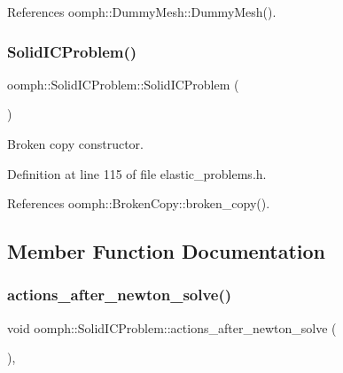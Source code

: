 References oomph\+::\+Dummy\+Mesh\+::\+Dummy\+Mesh().

\mbox{\label{classoomph_1_1SolidICProblem_a2f8924f554988e4c9bb98281231f9767}} 
\subsubsection{\texorpdfstring{Solid\+I\+C\+Problem()}{SolidICProblem()}\hspace{0.1cm}{\footnotesize\ttfamily [2/2]}}
{\footnotesize\ttfamily oomph\+::\+Solid\+I\+C\+Problem\+::\+Solid\+I\+C\+Problem (\begin{DoxyParamCaption}\item[{const \hyperlink{classoomph_1_1SolidICProblem}{Solid\+I\+C\+Problem} \&}]{ }\end{DoxyParamCaption})\hspace{0.3cm}{\ttfamily [inline]}}



Broken copy constructor. 



Definition at line 115 of file elastic\+\_\+problems.\+h.



References oomph\+::\+Broken\+Copy\+::broken\+\_\+copy().



\subsection{Member Function Documentation}
\mbox{\label{classoomph_1_1SolidICProblem_afef1ae777a009afd2329dcb091862f69}} 
\subsubsection{\texorpdfstring{actions\+\_\+after\+\_\+newton\+\_\+solve()}{actions\_after\_newton\_solve()}}
{\footnotesize\ttfamily void oomph\+::\+Solid\+I\+C\+Problem\+::actions\+\_\+after\+\_\+newton\+\_\+solve (\begin{DoxyParamCaption}{ }\end{DoxyParamCaption})\hspace{0.3cm}{\ttfamily [inline]}, {\ttfamily [virtual]}}



